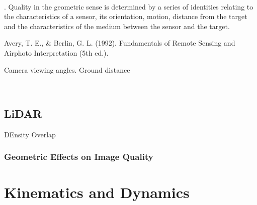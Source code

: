 ~~~

 \cite{Gupta2018}. 
Quality in the geometric sense is determined by a series of identities relating to the characteristics of a sensor, its orientation, motion, distance from the target and the characteristics of the medium between the sensor and the target.

\cite{Avery1992}
Avery, T. E., \& Berlin, G. L. (1992). Fundamentals of Remote Sensing and Airphoto Interpretation (5th ed.).

Camera viewing angles.
Ground distance

~~~



\subsection{LiDAR}

DEnsity
Overlap


\subsubsection{Geometric Effects on Image Quality}


\section{Kinematics and Dynamics}






